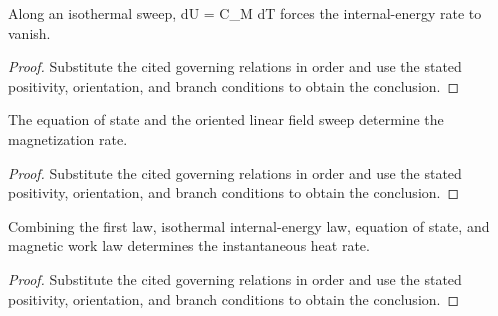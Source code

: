 \begin{lemma}
  \label{lem:physics:IPhO_2026_3_B_1:aux006}
  Along an isothermal sweep, dU = C\_M dT forces the internal-energy rate to vanish.
\end{lemma}
\begin{proof}
  Substitute the cited governing relations in order and use the stated positivity, orientation, and branch conditions to obtain the conclusion.
\end{proof}

\begin{lemma}
  \label{lem:physics:IPhO_2026_3_B_1:aux007}
  The equation of state and the oriented linear field sweep determine the magnetization rate.
\end{lemma}
\begin{proof}
  Substitute the cited governing relations in order and use the stated positivity, orientation, and branch conditions to obtain the conclusion.
\end{proof}

\begin{lemma}
  \label{lem:physics:IPhO_2026_3_B_1:aux008}
  Combining the first law, isothermal internal-energy law, equation of state, and magnetic work law determines the instantaneous heat rate.
\end{lemma}
\begin{proof}
  Substitute the cited governing relations in order and use the stated positivity, orientation, and branch conditions to obtain the conclusion.
\end{proof}
